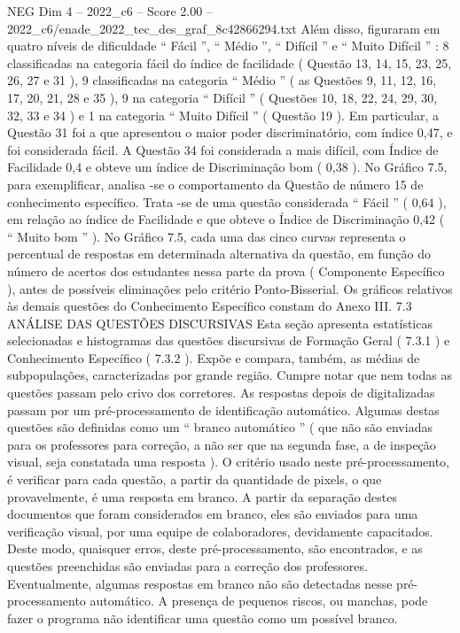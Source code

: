 \begin{textsample}{NEG Dim 4 – 2022\_c6 – Score 2.00 – 2022\_c6/enade\_2022\_tec\_des\_graf\_8c42866294.txt}
Além disso, figuraram em quatro níveis de dificuldade “ Fácil ”, “ Médio ”, “ Difícil ” e “ Muito Difícil ” : 8 classificadas na categoria fácil do índice de facilidade ( Questão 13, 14, 15, 23, 25, 26, 27 e 31 ), 9 classificadas na categoria “ Médio ” ( as Questões 9, 11, 12, 16, 17, 20, 21, 28 e 35 ), 9 na categoria “ Difícil ” ( Questões 10, 18, 22, 24, 29, 30, 32, 33 e 34 ) e 1 na categoria “ Muito Difícil ” ( Questão 19 ).
Em particular, a Questão 31 foi a que apresentou o maior poder discriminatório, com índice 0,47, e foi considerada fácil.
A Questão 34 foi considerada a mais difícil, com Índice de Facilidade 0,4 e obteve um índice de Discriminação bom ( 0,38 ).
No Gráfico 7.5, para exemplificar, analisa -se o comportamento da Questão de número 15 de conhecimento específico.
Trata -se de uma questão considerada “ Fácil ” ( 0,64 ), em relação ao índice de Facilidade e que obteve o Índice de Discriminação 0,42 ( “ Muito bom ” ).
No Gráfico 7.5, cada uma das cinco curvas representa o percentual de respostas em determinada alternativa da questão, em função do número de acertos dos estudantes nessa parte da prova ( Componente Específico ), antes de possíveis eliminações pelo critério Ponto-Bisserial.
Os gráficos relativos às demais questões do Conhecimento Específico constam do Anexo III. 7.3 ANÁLISE DAS QUESTÕES DISCURSIVAS Esta seção apresenta estatísticas selecionadas e histogramas das questões discursivas de Formação Geral ( 7.3.1 ) e Conhecimento Específico ( 7.3.2 ).
Expõe e compara, também, as médias de subpopulações, caracterizadas por grande região.
Cumpre notar que nem todas as questões passam pelo crivo dos corretores.
As respostas depois de digitalizadas passam por um pré-processamento de identificação automático.
Algumas destas questões são definidas como um “ branco automático ” ( que não são enviadas para os professores para correção, a não ser que na segunda fase, a de inspeção visual, seja constatada uma resposta ).
O critério usado neste pré-processamento, é verificar para cada questão, a partir da quantidade de pixels, o que provavelmente, é uma resposta em branco.
A partir da separação destes documentos que foram considerados em branco, eles são enviados para uma verificação visual, por uma equipe de colaboradores, devidamente capacitados.
Deste modo, quaisquer erros, deste pré-processamento, são encontrados, e as questões preenchidas são enviadas para a correção dos professores.
Eventualmente, algumas respostas em branco não são detectadas nesse pré-processamento automático.
A presença de pequenos riscos, ou manchas, pode fazer o programa não identificar uma questão como um possível branco.

\end{textsample}
